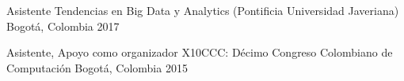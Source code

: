 


\begin{cvhonors}


  \cvhonor
  {Asistente}
  {Tendencias en Big Data y Analytics (Pontificia Universidad Javeriana)}
  {Bogotá, Colombia}
  {2017}

  \cvhonor
  {Asistente, Apoyo como organizador} %
  {X10CCC: Décimo Congreso Colombiano de Computación} %
  {Bogotá, Colombia} %
  {2015} %

\end{cvhonors}
